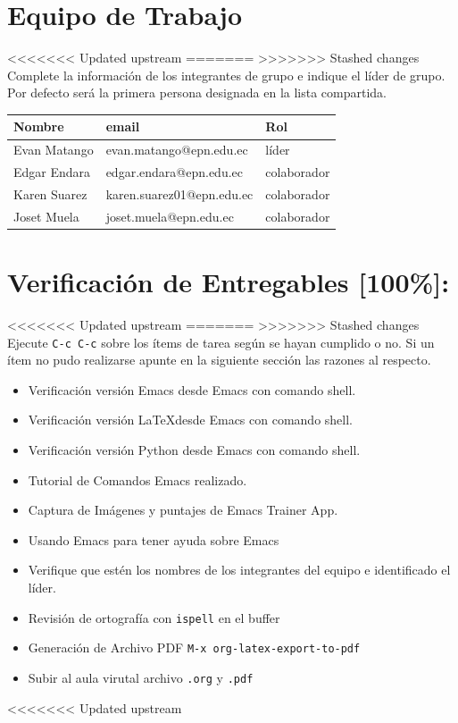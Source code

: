 \documentclass{article}
\begin{document}
\section{Equipo de Trabajo}
<<<<<<< Updated upstream
\label{sec:orgc514de8}
=======
\label{sec:orgd0bc137}
>>>>>>> Stashed changes
Complete la información de los integrantes de grupo e indique el líder
de grupo. Por defecto será la primera persona designada en la lista compartida.

\begin{center}
\begin{tabular}{lll}
\hline
Nombre & email & Rol\\[0pt]
\hline
Evan Matango & evan.matango@epn.edu.ec & líder\\[0pt]
Edgar Endara & edgar.endara@epn.edu.ec & colaborador\\[0pt]
Karen Suarez & karen.suarez01@epn.edu.ec & colaborador\\[0pt]
Joset Muela & joset.muela@epn.edu.ec & colaborador\\[0pt]
\hline
\end{tabular}
\end{center}

\section{Verificación de Entregables [100\%]:}
<<<<<<< Updated upstream
\label{sec:org8bfee3a}
=======
\label{sec:org64e4c54}
>>>>>>> Stashed changes
Ejecute \texttt{C-c C-c} sobre los ítems de tarea según se hayan cumplido o
no. Si un ítem no pudo realizarse apunte en la siguiente sección las
razones al respecto.
\begin{itemize}
\item[{$\boxtimes$}] Verificación versión Emacs desde Emacs con comando shell.
\item[{$\boxtimes$}] Verificación versión \LaTeX desde Emacs con comando shell.
\item[{$\boxtimes$}] Verificación versión Python desde Emacs con comando shell.
\item[{$\boxtimes$}] Tutorial de Comandos Emacs realizado.
\item[{$\boxtimes$}] Captura de Imágenes y puntajes de Emacs Trainer App.
\item[{$\boxtimes$}] Usando Emacs para tener ayuda sobre Emacs
\item[{$\boxtimes$}] Verifique que estén los nombres de los integrantes del equipo e
identificado el líder.
\item[{$\boxtimes$}] Revisión de ortografía con \texttt{ispell} en el buffer
\item[{$\boxtimes$}] Generación de Archivo PDF \texttt{M-x org-latex-export-to-pdf}
\item[{$\boxtimes$}] Subir al aula virutal archivo \texttt{.org} y \texttt{.pdf}
\end{itemize}
<<<<<<< Updated upstream
\end{document}
